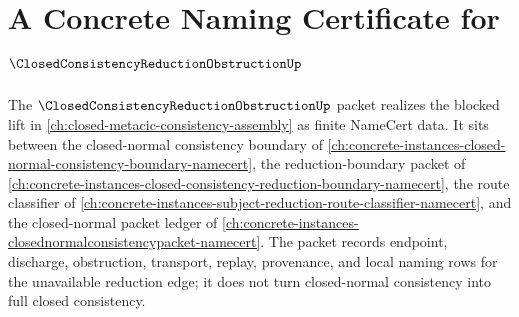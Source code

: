 \chapter{A Concrete Naming Certificate for $\ClosedConsistencyReductionObstructionUp$}
\label{ch:concrete-instances-closed-consistency-reduction-obstruction-namecert}

The $\ClosedConsistencyReductionObstructionUp$ packet realizes the blocked lift in \autoref{ch:closed-metacic-consistency-assembly} as finite NameCert data. It sits between the closed-normal consistency boundary of \autoref{ch:concrete-instances-closed-normal-consistency-boundary-namecert}, the reduction-boundary packet of \autoref{ch:concrete-instances-closed-consistency-reduction-boundary-namecert}, the route classifier of \autoref{ch:concrete-instances-subject-reduction-route-classifier-namecert}, and the closed-normal packet ledger of \autoref{ch:concrete-instances-closednormalconsistencypacket-namecert}. The packet records endpoint, discharge, obstruction, transport, replay, provenance, and local naming rows for the unavailable reduction edge; it does not turn closed-normal consistency into full closed consistency.

